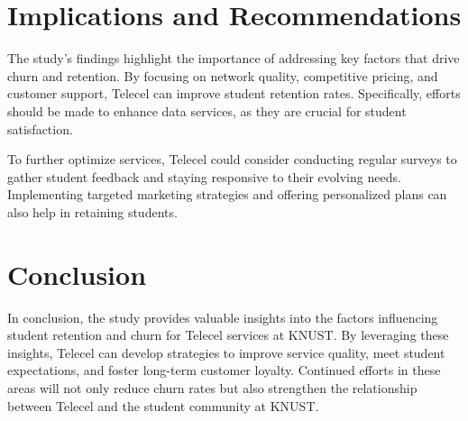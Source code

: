 \documentclass[doublespacing]{report} %
\begin{document}
\section{Implications and Recommendations}

The study's findings highlight the importance of addressing key factors that drive churn and retention. By focusing on network quality, competitive pricing, and customer support, Telecel can improve student retention rates. Specifically, efforts should be made to enhance data services, as they are crucial for student satisfaction.

To further optimize services, Telecel could consider conducting regular surveys to gather student feedback and staying responsive to their evolving needs. Implementing targeted marketing strategies and offering personalized plans can also help in retaining students.

\section{Conclusion}

In conclusion, the study provides valuable insights into the factors influencing student retention and churn for Telecel services at KNUST. By leveraging these insights, Telecel can develop strategies to improve service quality, meet student expectations, and foster long-term customer loyalty. Continued efforts in these areas will not only reduce churn rates but also strengthen the relationship between Telecel and the student community at KNUST.
\end{document}
